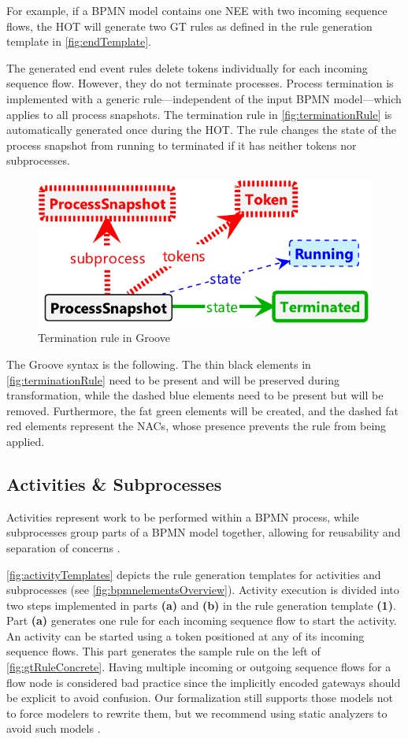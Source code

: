 \documentclass{lmcs} %
\begin{document}
For example, if a BPMN model contains one \textsf{NEE} with two incoming sequence flows, the HOT will generate two GT rules as defined in the rule generation template in \autoref{fig:endTemplate}.

The generated end event rules delete tokens individually for each incoming sequence flow.
However, they do not terminate processes.
Process termination is implemented with a generic rule---independent of the input BPMN model---which applies to all process snapshots.
The termination rule in \autoref{fig:terminationRule} is automatically generated once during the HOT.
The rule changes the state of the process snapshot from running to terminated if it has neither tokens nor subprocesses.

\begin{figure}[ht]
    \centering
    \includegraphics[width=.4\textwidth]{images/Terminate.pdf}
    \caption{Termination rule in Groove}
    \label{fig:terminationRule}
\end{figure}

The Groove syntax is the following.
The thin black elements in \autoref{fig:terminationRule} need to be present and will be preserved during transformation, while the dashed blue elements need to be present but will be removed.
Furthermore, the fat green elements will be created, and the dashed fat red elements represent the NACs, whose presence prevents the rule from being applied.

\subsection{Activities \& Subprocesses}
Activities represent work to be performed within a BPMN process, while subprocesses group parts of a BPMN model together, allowing for reusability and separation of concerns \cite{objectmanagementgroupBusinessProcessModel2013}.

\autoref{fig:activityTemplates} depicts the rule generation templates for activities and subprocesses (see \autoref{fig:bpmnelementsOverview}).
Activity execution is divided into two steps implemented in parts \textbf{(a)} and \textbf{(b)} in the rule generation template \textbf{(1)}.
Part \textbf{(a)} generates one rule for each incoming sequence flow to start the activity.
An activity can be started using a token positioned at any of its incoming sequence flows.
This part generates the sample rule on the left of \autoref{fig:gtRuleConcrete}.
Having multiple incoming or outgoing sequence flows for a flow node is considered bad practice since the implicitly encoded gateways should be explicit to avoid confusion.
Our formalization still supports those models not to force modelers to rewrite them, but we recommend using static analyzers to avoid such models \cite{camundaservicesgmbhBpmnlint2023}.
\end{document}
